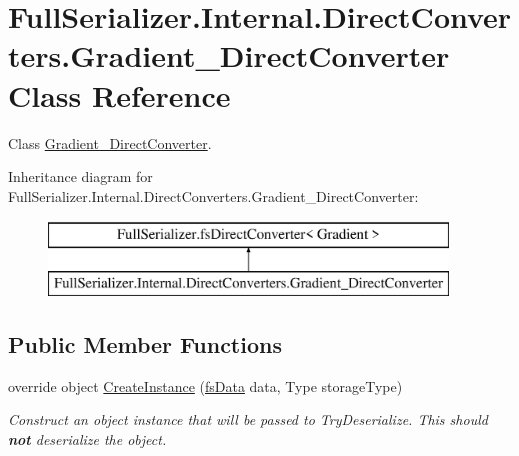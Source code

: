 \hypertarget{class_full_serializer_1_1_internal_1_1_direct_converters_1_1_gradient___direct_converter}{}\section{Full\+Serializer.\+Internal.\+Direct\+Converters.\+Gradient\+\_\+\+Direct\+Converter Class Reference}
\label{class_full_serializer_1_1_internal_1_1_direct_converters_1_1_gradient___direct_converter}


Class \hyperlink{class_full_serializer_1_1_internal_1_1_direct_converters_1_1_gradient___direct_converter}{Gradient\+\_\+\+Direct\+Converter}.  


Inheritance diagram for Full\+Serializer.\+Internal.\+Direct\+Converters.\+Gradient\+\_\+\+Direct\+Converter\+:\begin{figure}[H]
\begin{center}
\leavevmode
\includegraphics[height=2.000000cm]{class_full_serializer_1_1_internal_1_1_direct_converters_1_1_gradient___direct_converter}
\end{center}
\end{figure}
\subsection*{Public Member Functions}
\begin{DoxyCompactItemize}
\item 
override object \hyperlink{class_full_serializer_1_1_internal_1_1_direct_converters_1_1_gradient___direct_converter_ab258e764b6b9ca08f1b0d38de248b7e1}{Create\+Instance} (\hyperlink{class_full_serializer_1_1fs_data}{fs\+Data} data, Type storage\+Type)
\begin{DoxyCompactList}\small\item\em Construct an object instance that will be passed to Try\+Deserialize. This should {\bfseries not} deserialize the object. \end{DoxyCompactList}\end{DoxyCompactItemize}
